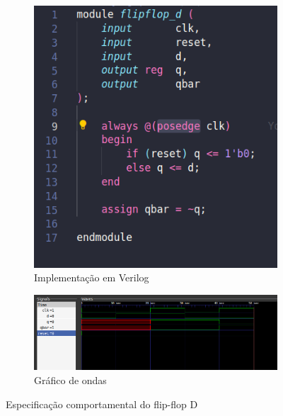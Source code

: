 \documentclass{article}
\begin{document}
\begin{figure}[H]
    \centering
    \hfill
    \begin{subfigure}[c]{0.3\textwidth}
        \centering
        \includegraphics[width=\textwidth]{images/dflipflop_behavioral_code.png}
        \caption{Implementação em Verilog}
        \label{fig:behavioral_specification}
    \end{subfigure}
    \hfill
    \begin{subfigure}[c]{0.6\textwidth}
        \centering
        \includegraphics[width=\textwidth]{images/dflipflop_behavioral_wave.png}
        \caption{Gráfico de ondas}
        \label{fig:behavioral_wave}
    \end{subfigure}
    \hfill
    \caption{Especificação comportamental do flip-flop D}

\end{figure}
\end{document}
